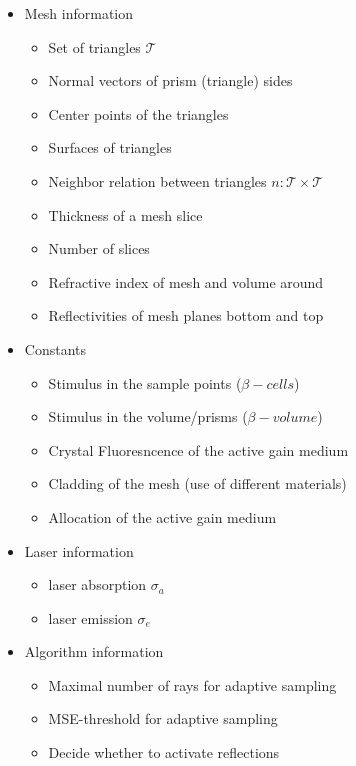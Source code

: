 \begin{itemize}
  \label{label:input}
  \item Mesh information
    \begin{itemize}
    \item Set of triangles $\mathcal{T}$
    \item Normal vectors of prism (triangle) sides
    \item Center points of the triangles
    \item Surfaces of triangles
    \item Neighbor relation between triangles $n : \mathcal{T} \times \mathcal{T}$
    \item Thickness of a mesh slice 
    \item Number of slices
    \item Refractive index of mesh and volume around
    \item Reflectivities of mesh planes bottom and top
    \end{itemize}

  \item Constants 
    \begin{itemize}
      \item Stimulus in the sample points ($\beta-cells$)
      \item Stimulus in the volume/prisms ($\beta-volume$)
      \item Crystal Fluoresncence of the active gain medium
      \item Cladding of the mesh (use of different materials)
      \item Allocation of the active gain medium
    \end{itemize}

  \item Laser information
    \begin{itemize}
      \item laser absorption $\sigma_a$
      \item laser emission $\sigma_e$
    \end{itemize}

  \item Algorithm information
    \begin{itemize}
      \item Maximal number of rays for adaptive sampling
      \item MSE-threshold for adaptive sampling
      \item Decide whether to activate reflections
    \end{itemize}
    
\end{itemize}

